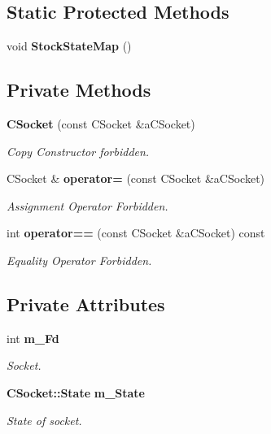 \subsection*{Static Protected Methods}
\begin{CompactItemize}
\item 
void {\bf Stock\-State\-Map} ()
\end{CompactItemize}
\subsection*{Private Methods}
\begin{CompactItemize}
\item 
{\bf CSocket} (const CSocket \&a\-CSocket)
\begin{CompactList}\small\item\em Copy Constructor forbidden.\item\end{CompactList}\item 
CSocket \& {\bf operator=} (const CSocket \&a\-CSocket)
\begin{CompactList}\small\item\em Assignment Operator Forbidden.\item\end{CompactList}\item 
int {\bf operator==} (const CSocket \&a\-CSocket) const
\begin{CompactList}\small\item\em Equality Operator Forbidden.\item\end{CompactList}\end{CompactItemize}
\subsection*{Private Attributes}
\begin{CompactItemize}
\item 
int {\bf m\_\-Fd}
\begin{CompactList}\small\item\em Socket.\item\end{CompactList}\item 
{\bf CSocket::State} {\bf m\_\-State}
\begin{CompactList}\small\item\em State of socket.\item\end{CompactList}\end{CompactItemize}
